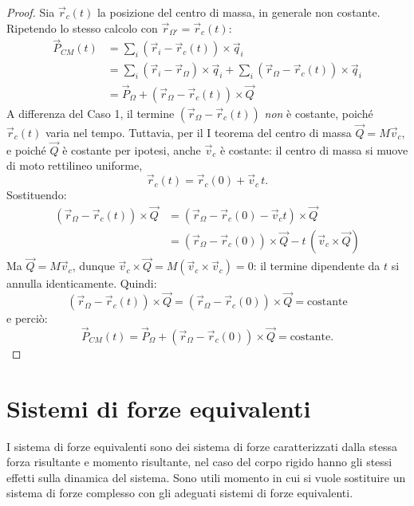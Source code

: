 \documentclass[11pt, a4paper, openright]{book}
\theoremstyle{plain}
\theoremstyle{definition}
\begin{document}
\begin{proof}
Sia $\vec{r}_c(t)$ la posizione del centro di massa, in generale non costante. Ripetendo lo stesso calcolo con $\vec{r}_{\Omega'} = \vec{r}_c(t)$:
\begin{align}
    \vec{P}_{CM}(t) & = \sum_i (\vec{r}_i - \vec{r}_c(t)) \times \vec{q}_i \\
    & = \sum_i (\vec{r}_i - \vec{r}_\Omega) \times \vec{q}_i + \sum_i (\vec{r}_\Omega - \vec{r}_c(t)) \times \vec{q}_i \\
    & = \vec{P}_\Omega + (\vec{r}_\Omega - \vec{r}_c(t)) \times \vec{Q}
\end{align}
    A differenza del Caso 1, il termine $(\vec{r}_\Omega - \vec{r}_c(t))$ \emph{non} è costante, poiché $\vec{r}_c(t)$ varia nel tempo. Tuttavia, per il I teorema del centro di massa $\vec{Q} = M\vec{v}_c$, e poiché $\vec{Q}$ è costante per ipotesi, anche $\vec{v}_c$ è costante: il centro di massa si muove di moto rettilineo uniforme,
\begin{equation}
    \vec{r}_c(t) = \vec{r}_c(0) + \vec{v}_c\, t.
\end{equation}
    Sostituendo:
\begin{align}
    (\vec{r}_\Omega - \vec{r}_c(t)) \times \vec{Q} & = (\vec{r}_\Omega - \vec{r}_c(0) - \vec{v}_c t) \times \vec{Q} \\
    & = (\vec{r}_\Omega - \vec{r}_c(0)) \times \vec{Q} - t\,(\vec{v}_c \times \vec{Q})
\end{align}
    Ma $\vec{Q} = M\vec{v}_c$, dunque $\vec{v}_c \times \vec{Q} = M(\vec{v}_c \times \vec{v}_c) = 0$: il termine dipendente da $t$ si annulla identicamente. Quindi:
\begin{equation}
    (\vec{r}_\Omega - \vec{r}_c(t)) \times \vec{Q} = (\vec{r}_\Omega - \vec{r}_c(0)) \times \vec{Q} = \text{costante}
\end{equation}
    e perciò:
\begin{equation}
    \vec{P}_{CM}(t) = \vec{P}_\Omega + (\vec{r}_\Omega - \vec{r}_c(0)) \times \vec{Q} = \text{costante}.
\end{equation}
\end{proof}

\section{Sistemi di forze equivalenti}
I sistema di forze equivalenti sono dei sistema di forze caratterizzati dalla stessa forza risultante e momento risultante, nel caso del corpo rigido hanno gli stessi effetti sulla dinamica del sistema.
Sono utili momento in cui si vuole sostituire un sistema di forze complesso con gli adeguati sistemi di forze equivalenti.
\end{document}
